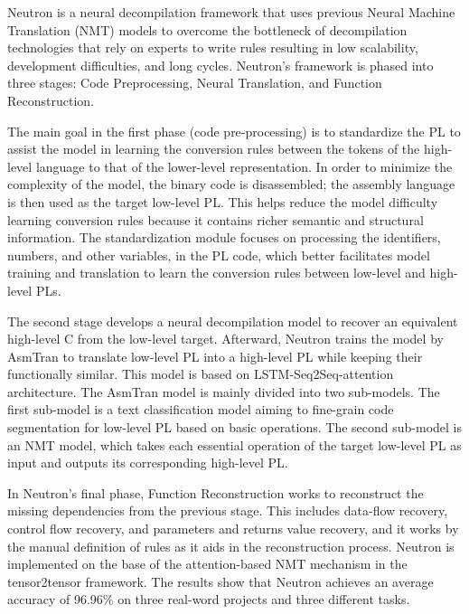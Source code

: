 \documentclass[conference,a4paper]{IEEEtran}
\begin{document}
Neutron is a neural decompilation framework that uses previous Neural Machine Translation (NMT) models to overcome the bottleneck of decompilation technologies that rely on experts to write rules resulting in low scalability, development difficulties, and long cycles.
Neutron’s framework is phased into three stages: Code Preprocessing, Neural Translation, and Function Reconstruction.

The main goal in the first phase (code pre-processing) is to standardize the PL to assist the model in learning the conversion rules between the tokens of the high-level language to that of the lower-level representation.
In order to minimize the complexity of the model, the binary code is disassembled; the assembly language is then used as the target low-level PL.
This helps reduce the model difficulty learning conversion rules because it contains richer semantic and structural information.
The standardization module focuses on processing the identifiers, numbers, and other variables, in the PL code, which better facilitates model training and translation to learn the conversion rules between low-level and high-level PLs.

The second stage develops a neural decompilation model to recover an equivalent high-level C from the low-level target.
Afterward, Neutron trains the model by AsmTran to translate low-level PL into a high-level PL while keeping their functionally similar.
This model is based on LSTM-Seq2Seq-attention architecture.
The AsmTran model is mainly divided into two sub-models.
The first sub-model is a text classification model aiming to fine-grain code segmentation for low-level PL based on basic operations.
The second sub-model is an NMT model, which takes each essential operation of the target low-level PL as input and outputs its corresponding high-level PL.

In Neutron’s final phase, Function Reconstruction works to reconstruct the missing dependencies from the previous stage.
This includes data-flow recovery, control flow recovery, and parameters and returns value recovery, and it works by the manual definition of rules as it aids in the reconstruction process. Neutron is implemented on the base of the attention-based NMT mechanism in the tensor2tensor framework. The results show that Neutron achieves an average accuracy of 96.96\% on three real-word projects and three different tasks.
\end{document}
